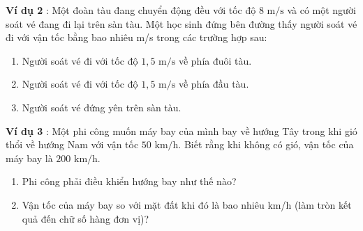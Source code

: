 \noindent\textbf{Ví dụ 2} : Một đoàn tàu đang chuyển động đều với tốc độ $8\text{ m/s}$ và có một người soát vé đang đi lại trên sàn tàu. Một học sinh đứng bên đường thấy người soát vé đi với vận tốc bằng bao nhiêu m/s trong các trường hợp sau:
\begin{enumerate}[\bfseries a)]
    \item Người soát vé đi với tốc độ $1{,}5\text{ m/s}$ về phía đuôi tàu.
    \item Người soát vé đi với tốc độ $1{,}5\text{ m/s}$ về phía đầu tàu.
    \item Người soát vé đứng yên trên sàn tàu.
\end{enumerate}

\noindent\textbf{Ví dụ 3} : Một phi công muốn máy bay của mình bay về hướng Tây trong khi gió thổi về hướng Nam với vận tốc $50\text{ km/h}$. Biết rằng khi không có gió, vận tốc của máy bay là $200\text{ km/h}$.
\begin{enumerate}[\bfseries a)]
    \item Phi công phải điều khiển hướng bay như thế nào?
    \item Vận tốc của máy bay so với mặt đất khi đó là bao nhiêu km/h (làm tròn kết quả đến chữ số hàng đơn vị)?
\end{enumerate}

